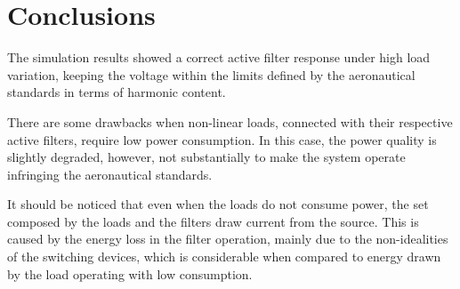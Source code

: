 \section{Conclusions}

The simulation results showed a correct active filter response under high load variation, keeping the voltage within the limits defined by the aeronautical standards in terms of harmonic content.

There are some drawbacks when non-linear loads, connected with their respective active filters, require low power consumption. In this case, the power quality is slightly degraded, however, not substantially to make the system operate infringing the aeronautical standards.

It should be noticed that even when the loads do not consume power, the set composed by the loads and the filters draw current from the source. This is caused by the energy loss in the filter operation, mainly due to the non-idealities of the switching devices, which is considerable when compared to energy drawn by the load operating with low consumption.
